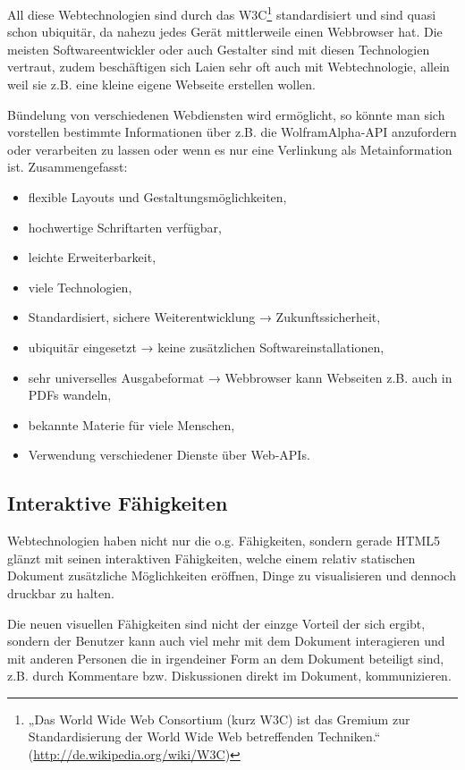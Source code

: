 All diese Webtechnologien sind durch das W3C\footnote{
„Das World Wide Web Consortium (kurz W3C) ist das Gremium zur
Standardisierung der World Wide Web betreffenden Techniken.“
(\url{http://de.wikipedia.org/wiki/W3C})} standardisiert
und sind quasi schon ubiquitär, da nahezu jedes Gerät mittlerweile einen
Webbrowser hat. Die meisten Softwareentwickler oder auch
Gestalter sind mit diesen Technologien vertraut, zudem beschäftigen sich
Laien sehr oft auch mit Webtechnologie, allein weil sie z.B. eine kleine
eigene Webseite erstellen wollen.

Bündelung von verschiedenen Webdiensten wird ermöglicht, so könnte man sich
vorstellen bestimmte Informationen über z.B. die WolframAlpha-API
anzufordern oder verarbeiten zu lassen oder wenn es nur eine Verlinkung
als Metainformation ist. Zusammengefasst:

\begin{itemize}
  \item flexible Layouts und Gestaltungsmöglichkeiten,
  \item hochwertige Schriftarten verfügbar,
  \item leichte Erweiterbarkeit,
  \item viele Technologien,
  \item Standardisiert, sichere Weiterentwicklung → Zukunftssicherheit,
  \item ubiquitär eingesetzt → keine zusätzlichen Softwareinstallationen,
  \item sehr universelles Ausgabeformat → Webbrowser
        kann Webseiten z.B. auch in PDFs wandeln,
  \item bekannte Materie für viele Menschen,
  \item Verwendung verschiedener Dienste über Web-APIs.
\end{itemize}

\subsection{Interaktive Fähigkeiten}

Webtechnologien haben nicht nur die o.g. Fähigkeiten, sondern gerade
HTML5 glänzt mit seinen interaktiven Fähigkeiten, welche einem relativ
statischen Dokument zusätzliche Möglichkeiten eröffnen, Dinge zu
visualisieren und dennoch druckbar zu halten.

Die neuen visuellen Fähigkeiten sind nicht der einzge Vorteil der sich ergibt,
sondern der Benutzer kann auch viel mehr mit dem Dokument interagieren
und mit anderen Personen die in irgendeiner Form an dem Dokument beteiligt
sind, z.B. durch Kommentare bzw. Diskussionen direkt im Dokument,
kommunizieren.

